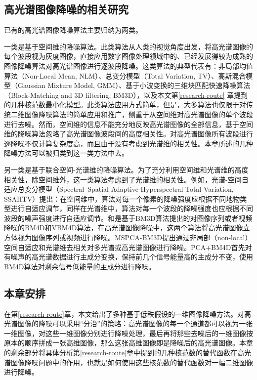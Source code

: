 \documentclass[12pt, a4paper]{article}
\begin{document}
\subsection{高光谱图像降噪的相关研究}
\par 已有的高光谱图像降噪算法主要归纳为两类。
\par 一类是基于空间维的降噪算法。此类算法从人类的视觉角度出发，将高光谱图像的每个波段视为灰度图像，直接应用数字图像处理领域中的、已经发展得较为成熟的图像降噪算法对高光谱图像进行逐波段降噪。这类算法的典型代表有：非局部均值算法（Non-Local Mean, NLM）\cite{NLM}、总变分模型（Total Variation, TV）\cite{TV}、高斯混合模型（Gaussian Mixture Model, GMM）\cite{GMM}、基于小波变换的三维块匹配快速降噪算法（Block-Matching and 3D filtering, BM3D）\cite{BM3D}，以及本文第\ref{research-route} 章提到的几种核范数最小化模型。此类算法应用方式简单，但是，大多算法也仅限于对传统二维图像降噪算法的简单应用和推广，侧重于从空间维对高光谱图像的单个波段进行去噪。然而，空间维的信息不能充分地反映高光谱图像的全部信息，基于空间维的降噪算法忽略了高光谱图像波段间的高度相关性。对高光谱图像所有波段进行逐降噪不仅计算复杂度高，而且由于没有考虑到光谱维的相关性。本章所述的几种降噪方法可以被归类到这一类方法中去。
\par 另一类是基于联合空间-光谱维的降噪算法。为了充分利用空间维和光谱维的高度相关性，除空间维外，这一类算法考虑到了光谱维的相关性。例如，光谱-空间自适应总变分模型（Spectral–Spatial Adaptive Hyperspectral Total Variation, SSAHTV）\cite{SSAHTV}提出：在空间维中，算法对每一个像素的降噪强度应根据不同地物类型进行自适应调节，同样在光谱维中，算法对每一个波段的降噪强度也应根据不同波段的噪声强度进行自适应调节。\cite{BM4D}和\cite{VBM4D}是基于BM3D算法提出的对图像序列或者视频降噪的BM4D和VBM4D算法，在高光谱图像降噪中，这两个算法将高光谱图像立方体视为图像序列或视频进行降噪。MSPCA-BM3D\cite{MSPCA-BM3D}提出通过非局部（non-local）空间自适应和光谱维去相关对多光谱或高光谱图像进行降噪。PCA+BM4D\cite{PCAplusBM4D}首先对有噪声的高光谱数据进行主成分变换，保持前几个信号能量高的主成分不变，使用BM4D算法对剩余信号低能量的主成分进行降噪\cite{yaodan}。
\subsection{本章安排}
\par 在第\ref{research-route}章，本文给出了多种基于低秩假设的一维图像降噪方法。对高光谱图像的降噪可以采用“分治”的策略：高光谱图像的每一个通道都可以视为一张一维图像，对这些一维图像分别进行降噪处理，最后再将那些去噪后的一维图像按原本的顺序拼成一张高维图像，那么这张高维图像即是降噪后的高光谱图像。本章的剩余部分将具体分析第\ref{research-route}章中提到的几种核范数的替代函数在高光谱图像降噪问题中的作用，也就是如何使用这些核范数的替代函数对一幅二维图像进行降噪。
\end{document}
